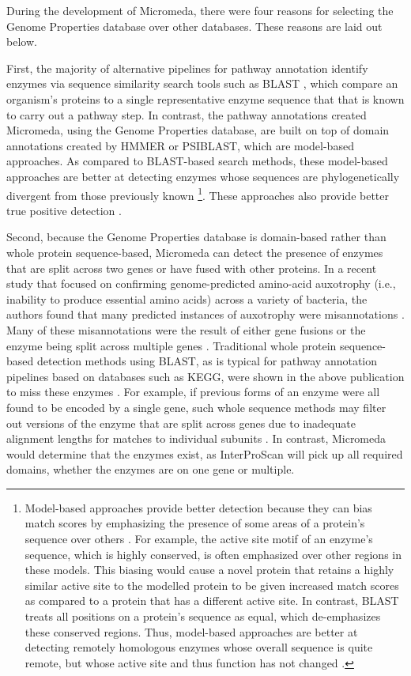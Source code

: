 During the development of Micromeda, there were four reasons for selecting the Genome Properties database over other databases. These reasons are laid out below.

First, the majority of alternative pipelines for pathway annotation identify enzymes via sequence similarity search tools such as BLAST \cite{altschul1990basic}, which compare an organism's proteins to a single representative enzyme sequence that that is known to carry out a pathway step. In contrast, the pathway annotations created Micromeda, using the Genome Properties database, are built on top of domain annotations created by HMMER or PSIBLAST, which are model-based approaches. As compared to BLAST-based search methods, these model-based approaches are better at detecting enzymes whose sequences are phylogenetically divergent from those previously known \cite{eddy2011accelerated} \footnote{Model-based approaches provide better detection because they can bias match scores by emphasizing the presence of some areas of a protein's sequence over others \cite{eddy2011accelerated}. For example, the active site motif of an enzyme's sequence, which is highly conserved, is often emphasized over other regions in these models. This biasing would cause a novel protein that retains a highly similar active site to the modelled protein to be given increased match scores as compared to a protein that has a different active site. In contrast, BLAST treats all positions on a protein's sequence as equal, which de-emphasizes these conserved regions. Thus, model-based approaches are better at detecting remotely homologous enzymes whose overall sequence is quite remote, but whose active site and thus function has not changed \cite{eddy2011accelerated}.}. These approaches also provide better true positive detection \cite{eddy2011accelerated}.

Second, because the Genome Properties database is domain-based rather than whole protein sequence-based, Micromeda can detect the presence of enzymes that are split across two genes or have fused with other proteins. In a recent study that focused on confirming genome-predicted amino-acid auxotrophy (i.e., inability to produce essential amino acids) across a variety of bacteria, the authors found that many predicted instances of auxotrophy were misannotations \cite{price2018filling}. Many of these misannotations were the result of either gene fusions or the enzyme being split across multiple genes \cite{price2018filling}. Traditional whole protein sequence-based detection methods using BLAST, as is typical for pathway annotation pipelines based on databases such as KEGG, were shown in the above publication to miss these enzymes \cite{price2018filling}. For example, if previous forms of an enzyme were all found to be encoded by a single gene, such whole sequence methods may filter out versions of the enzyme that are split across genes due to inadequate alignment lengths for matches to individual subunits \cite{price2018filling}. In contrast, Micromeda would determine that the enzymes exist, as InterProScan will pick up all required domains, whether the enzymes are on one gene or multiple.

